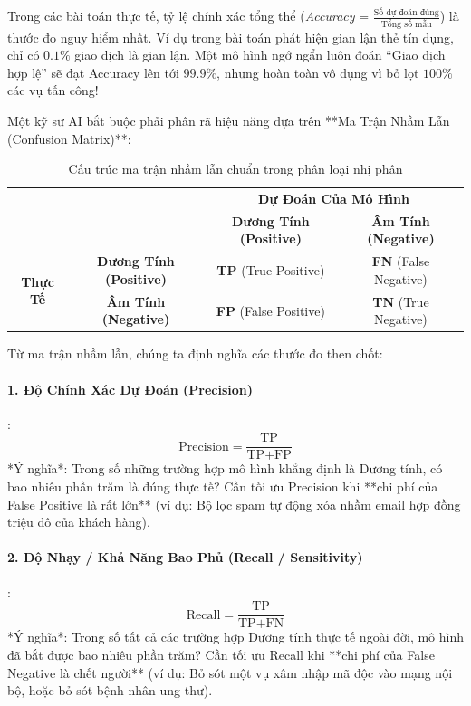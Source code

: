 Trong các bài toán thực tế, tỷ lệ chính xác tổng thể (\textit{Accuracy} = $\frac{\text{Số dự đoán đúng}}{\text{Tổng số mẫu}}$) là thước đo nguy hiểm nhất. Ví dụ trong bài toán phát hiện gian lận thẻ tín dụng, chỉ có $0.1\%$ giao dịch là gian lận. Một mô hình ngớ ngẩn luôn đoán ``Giao dịch hợp lệ'' sẽ đạt Accuracy lên tới $99.9\%$, nhưng hoàn toàn vô dụng vì bỏ lọt $100\%$ các vụ tấn công!

Một kỹ sư AI bắt buộc phải phân rã hiệu năng dựa trên **Ma Trận Nhầm Lẫn (Confusion Matrix)**:

\begin{table}[htbp]
\centering
\small
\setlength{\tabcolsep}{8pt}
\begin{tabular}{cc|cc}
\multicolumn{2}{c}{} & \multicolumn{2}{c}{\textbf{Dự Đoán Của Mô Hình}} \\
\multicolumn{2}{c|}{} & \textbf{Dương Tính (Positive)} & \textbf{Âm Tính (Negative)} \\
\hline
\multirow{2}{*}{\textbf{Thực Tế}} & \textbf{Dương Tính (Positive)} & \textbf{TP} (True Positive) & \textbf{FN} (False Negative) \\
& \textbf{Âm Tính (Negative)} & \textbf{FP} (False Positive) & \textbf{TN} (True Negative) \\
\end{tabular}
\caption{Cấu trúc ma trận nhầm lẫn chuẩn trong phân loại nhị phân}
\label{tbl:confusion-matrix-layout}
\end{table}

Từ ma trận nhầm lẫn, chúng ta định nghĩa các thước đo then chốt:

\paragraph{1. Độ Chính Xác Dự Đoán (Precision)}:
\begin{equation}
\text{Precision} = \frac{\text{TP}}{\text{TP} + \text{FP}}
\end{equation}
*Ý nghĩa*: Trong số những trường hợp mô hình khẳng định là Dương tính, có bao nhiêu phần trăm là đúng thực tế? Cần tối ưu Precision khi **chi phí của False Positive là rất lớn** (ví dụ: Bộ lọc spam tự động xóa nhầm email hợp đồng triệu đô của khách hàng).

\paragraph{2. Độ Nhạy / Khả Năng Bao Phủ (Recall / Sensitivity)}:
\begin{equation}
\text{Recall} = \frac{\text{TP}}{\text{TP} + \text{FN}}
\end{equation}
*Ý nghĩa*: Trong số tất cả các trường hợp Dương tính thực tế ngoài đời, mô hình đã bắt được bao nhiêu phần trăm? Cần tối ưu Recall khi **chi phí của False Negative là chết người** (ví dụ: Bỏ sót một vụ xâm nhập mã độc vào mạng nội bộ, hoặc bỏ sót bệnh nhân ung thư).

